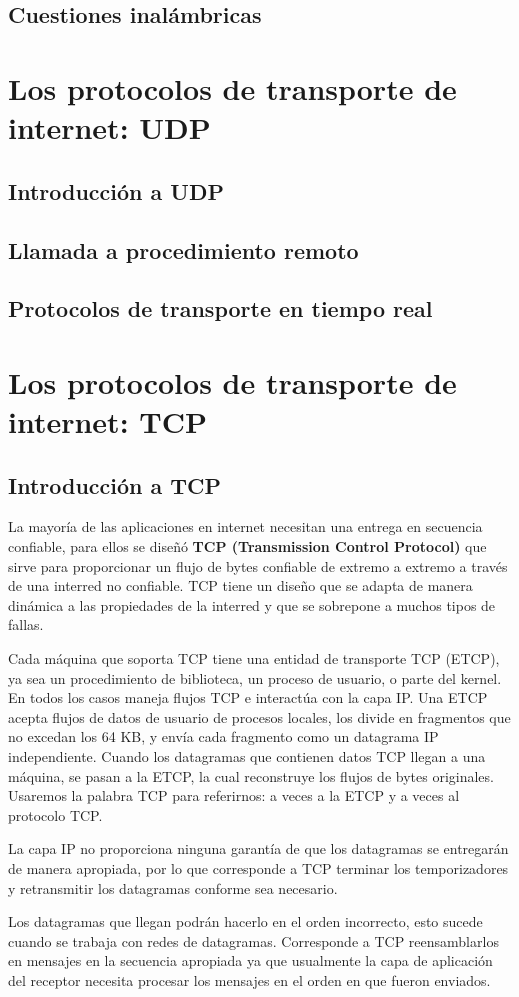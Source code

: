 \documentclass[10pt,a4paper]{report}
\begin{document}
\subsection{Cuestiones inalámbricas}
\section{Los protocolos de transporte de internet: UDP}
\subsection{Introducción a UDP}
\subsection{Llamada a procedimiento remoto}
\subsection{Protocolos de transporte en tiempo real}


\section{Los protocolos de transporte de internet: TCP}

\subsection{Introducción a TCP}
\par La mayoría de las aplicaciones en internet necesitan una entrega en secuencia 
confiable, para ellos se diseñó \textbf{TCP (Transmission Control Protocol)} que sirve 
para proporcionar un flujo de bytes confiable de extremo a extremo a través de una 
interred no confiable. TCP tiene un diseño que se adapta de manera dinámica a las 
propiedades de la interred y que se sobrepone a muchos tipos de fallas.
\par Cada máquina que soporta TCP tiene una entidad de transporte TCP (ETCP), ya 
sea un procedimiento de biblioteca, un proceso de usuario, o parte del kernel. En todos 
los casos maneja flujos TCP e interactúa con la capa IP. Una ETCP acepta flujos de 
datos de usuario de procesos locales, los divide en fragmentos que no excedan los 64 
KB, y envía cada fragmento como un datagrama IP independiente. Cuando los 
datagramas que contienen datos TCP llegan a una máquina, se pasan a la ETCP, la cual 
reconstruye los flujos de bytes originales. Usaremos la palabra TCP para referirnos: a 
veces a la ETCP y a veces al protocolo TCP.
\par La capa IP no proporciona ninguna garantía de que los datagramas se entregarán 
de manera apropiada, por lo que corresponde a TCP terminar los temporizadores y 
retransmitir los datagramas conforme sea necesario.
\par Los datagramas que llegan podrán hacerlo en el orden incorrecto, esto sucede 
cuando se trabaja con redes de datagramas. Corresponde a TCP reensamblarlos en 
mensajes en la secuencia apropiada ya que usualmente la capa de aplicación del 
receptor necesita procesar los mensajes en el orden en que fueron enviados.
\end{document}
